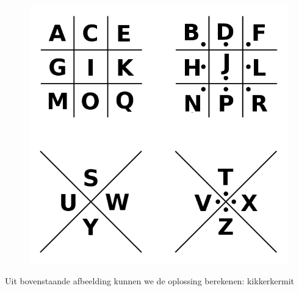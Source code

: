 \begin{figure}[H]
\includegraphics[scale=0.5, bb= 0 0 0 430]{encryptie/oef16.png}
\end{figure}
Uit bovenstaande afbeelding kunnen we de oplossing berekenen: kikkerkermit